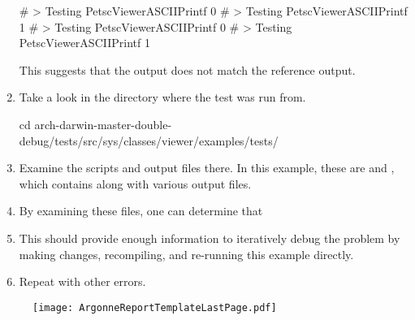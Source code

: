 \begin{enumerate}
\begin{outputlisting}
#	> Testing PetscViewerASCIIPrintf 0
#	> Testing PetscViewerASCIIPrintf 1
#	> Testing PetscViewerASCIIPrintf 0
#	> Testing PetscViewerASCIIPrintf 1 
\end{outputlisting}
This suggests that the output does not match the reference output.
\item Take a look in the directory where the test was run from.
\begin{outputlisting}
cd arch-darwin-master-double-debug/tests/src/sys/classes/viewer/examples/tests/
\end{outputlisting}
\item Examine the scripts and output files there. In this example, these are  and , which contains  along with various output files.
\item By examining these files, one can determine that
\item This should provide enough information to iteratively debug the problem by making changes, recompiling, and re-running this example directly.
\item Repeat with other errors.
\end{enumerate}




\pagestyle{empty}
\begin{figure*}[hbt]
\centerline{\texttt{[image: ArgonneReportTemplateLastPage.pdf]}}
\caption{}
\end{figure*}


